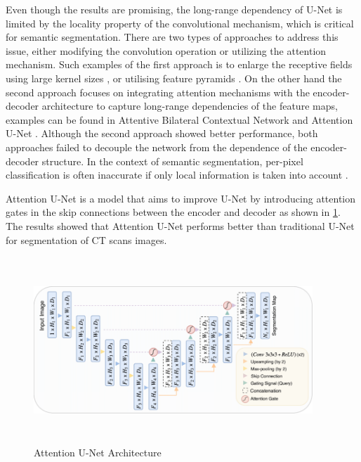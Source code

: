 Even though the results are promising, the long-range dependency of U-Net is limited by the locality property of the convolutional mechanism, which is critical for semantic segmentation. There are two types of approaches to address this issue, either modifying the convolution operation or utilizing the attention mechanism. Such examples of the first approach is to enlarge the receptive fields using large kernel sizes \cite{enlarge-receptive-field}, or utilising feature pyramids \cite{feature-pyramid}. On the other hand the second approach focuses on integrating attention mechanisms with the encoder-decoder architecture to capture long-range dependencies of the feature maps, examples can be found in Attentive Bilateral Contextual Network \cite{abcnet} and Attention U-Net \cite{attention-unet}. Although the second approach showed better performance, both approaches failed to decouple the network from the dependence of the encoder-decoder structure. In the context of semantic segmentation, per-pixel classification is often inaccurate if only local information is taken into account \cite{swin-v1}.

Attention U-Net \cite{attention-unet} is a model that aims to improve U-Net by introducing attention gates in the skip connections between the encoder and decoder as shown in \ref{fig:attention-unet}. The results showed that Attention U-Net performs better than traditional U-Net for segmentation of CT scans images.

\begin{figure}[ht]
\includegraphics[width=10.5cm, height=7cm]{images/attention-unet.png}
\centering
\caption{Attention U-Net Architecture}
\label{fig:attention-unet}
\end{figure}

